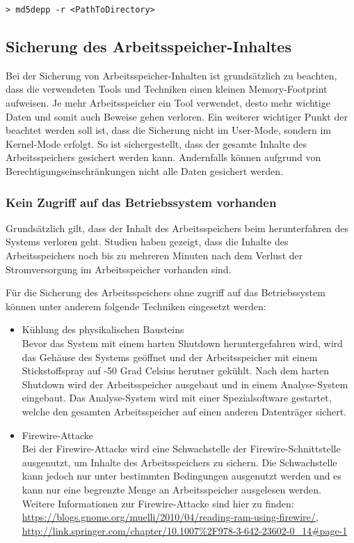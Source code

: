 \begin{lstlisting}
> md5depp -r <PathToDirectory>
\end{lstlisting}



\subsection{Sicherung des Arbeitsspeicher-Inhaltes}
Bei der Sicherung von Arbeitsspeicher-Inhalten ist grundsätzlich zu beachten, dass die verwendeten Tools und Techniken einen kleinen Memory-Footprint aufweisen. Je mehr Arbeitsspeicher ein Tool verwendet, desto mehr wichtige Daten und somit auch Beweise gehen verloren. Ein weiterer wichtiger Punkt der beachtet werden soll ist, dass die Sicherung nicht im User-Mode, sondern im Kernel-Mode erfolgt. So ist sichergestellt, dass der gesamte Inhalte des Arbeitsspeichers gesichert werden kann. Andernfalls können aufgrund von Berechtigungseinschränkungen nicht alle Daten gesichert werden.

\subsubsection{Kein Zugriff auf das Betriebssystem vorhanden} 
Grundsätzlich gilt, dass der Inhalt des Arbeitsspeichers beim herunterfahren des Systems verloren geht. Studien haben gezeigt, dass die Inhalte des Arbeitsspeichers noch bis zu mehreren Minuten nach dem Verlust der Stromversorgung im Arbeitsspeicher vorhanden sind. 

Für die Sicherung des Arbeitsspeichers ohne zugriff auf das Betriebssystem können unter anderem folgende Techniken eingesetzt werden:
\begin{itemize}
\item Kühlung des physikalischen Bausteins\\
Bevor das System mit einem harten Shutdown heruntergefahren wird, wird das Gehäuse des Systems geöffnet und der Arbeitsspeicher mit einem Stickstoffspray auf -50 Grad Celsius herutner gekühlt. Nach dem harten Shutdown wird der Arbeitsspeicher ausgebaut und in einem Analyse-System  eingebaut. Das Analyse-System wird mit einer Spezialsoftware gestartet, welche den gesamten Arbeitsspeicher auf einen anderen Datenträger sichert.

\item Firewire-Attacke\\
Bei der Firewire-Attacke wird eine Schwachstelle der Firewire-Schnittstelle ausgenutzt, um Inhalte des Arbeitsspeichers zu sichern. Die Schwachstelle kann jedoch nur unter bestimmten Bedingungen ausgenutzt werden und es kann nur eine begrenzte Menge an Arbeitsspeicher ausgelesen werden. Weitere Informationen zur Firewire-Attacke sind hier zu finden: \url{https://blogs.gnome.org/muelli/2010/04/reading-ram-using-firewire/}, \url{http://link.springer.com/chapter/10.1007%2F978-3-642-23602-0_14#page-1}
\end{itemize}



